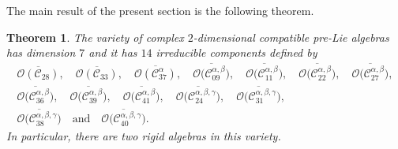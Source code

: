\documentclass[10pt,a4paper]{amsart}
\numberwithin{equation}{section}
\newtheorem{Theorem}{Theorem}[section]
\begin{document}
The main result of the present section is the following theorem.

\begin{Theorem}\label{geo4}
The variety of complex $2$-dimensional compatible pre-Lie algebras has
dimension $7$ and it has $14$ irreducible components defined by
\begin{gather*}
 \overline{\mathcal{O}( \mathcal{C}_{28})} , \quad
 \overline{\mathcal{O}( \mathcal{C}_{33})} , \quad
 \overline{ \mathcal{O}(\mathcal{C}_{37}^\alpha)} ,
\quad \overline{ \mathcal{O}\bigl(\mathcal{C}_{09}^{\alpha,\beta}\bigr)} ,
\quad \overline{ \mathcal{O}\bigl(\mathcal{C}_{11}^{\alpha,\beta}\bigr)} ,
\quad \overline{ \mathcal{O}\bigl(\mathcal{C}_{22}^{\alpha,\beta}\bigr)} ,
\quad\overline{ \mathcal{O}\bigl(\mathcal{C}_{27}^{\alpha,\beta}\bigr)} ,
\\ \overline{ \mathcal{O}\bigl(\mathcal{C}_{36}^{\alpha,\beta}\bigr)} ,
\quad \overline{ \mathcal{O}\bigl(\mathcal{C}_{39}^{\alpha,\beta}\bigr)} ,
\quad \overline{ \mathcal{O}\bigl(\mathcal{C}_{41}^{\alpha,\beta}\bigr)} ,
\quad \overline{ \mathcal{O}\bigl(\mathcal{C}_{24}^{\alpha,\beta,\gamma}\bigr)} ,
\quad \overline{ \mathcal{O}\bigl(\mathcal{C}_{31}^{\alpha,\beta,\gamma}\bigr)} ,
\\ \overline{\mathcal{O}\bigl(\mathcal{C}_{38}^{\alpha,\beta,\gamma}\bigr)} \quad \text{and}
\quad \overline{ \mathcal{O}\bigl(\mathcal{C}_{40}^{\alpha,\beta,\gamma}\bigr)}.
 \end{gather*}
 In particular, there are two rigid algebras in this variety.

\end{Theorem}
\end{document}
